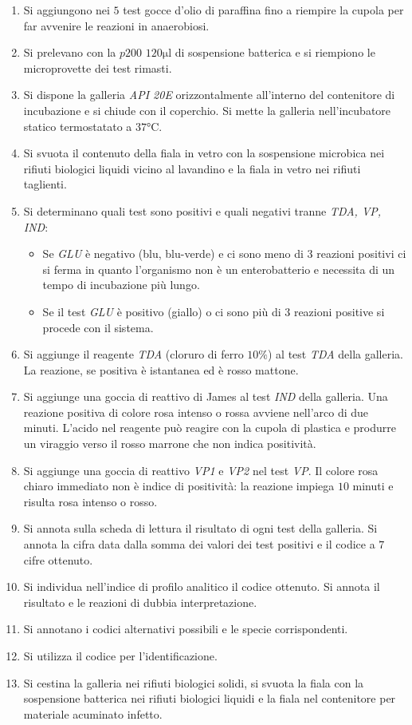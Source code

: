 \begin{enumerate}
			\item Si aggiungono nei $5$ test gocce d'olio di paraffina fino a riempire la cupola per far avvenire le reazioni in anaerobiosi.
			\item Si prelevano con la $p200$ $120\si{\micro\litre}$ di sospensione batterica e si riempiono le microprovette dei test rimasti.
			\item Si dispone la galleria \emph{API 20E} orizzontalmente all'interno del contenitore di incubazione e si chiude con il coperchio.
				Si mette la galleria nell'incubatore statico termostatato a $37\si{\celsius}$.
			\item Si svuota il contenuto della fiala in vetro con la sospensione microbica nei rifiuti biologici liquidi vicino al lavandino e la fiala in vetro nei rifiuti taglienti.
			\item Si determinano quali test sono positivi e quali negativi tranne \emph{TDA, VP, IND}:
				\begin{itemize}
					\item Se \emph{GLU} \`e negativo (blu, blu-verde) e ci sono meno di $3$ reazioni positivi ci si ferma in quanto l'organismo non \`e un enterobatterio e necessita di un tempo di incubazione pi\`u lungo.
					\item Se il test \emph{GLU} \`e positivo (giallo) o ci sono pi\`u di $3$ reazioni positive si procede con il sistema.
				\end{itemize}
			\item Si aggiunge il reagente \emph{TDA} (cloruro di ferro $10\%$) al test \emph{TDA} della galleria.
				La reazione, se positiva \`e istantanea ed \`e rosso mattone.
			\item Si aggiunge una goccia di reattivo di James al test \emph{IND} della galleria.
				Una reazione positiva di colore rosa intenso o rossa avviene nell'arco di due minuti.
				L'acido nel reagente pu\`o reagire con la cupola di plastica e produrre un viraggio verso il rosso marrone che non indica positivit\`a.
			\item Si aggiunge una goccia di reattivo \emph{VP1} e \emph{VP2} nel test \emph{VP}.
				Il colore rosa chiaro immediato non \`e indice di positivit\`a: la reazione impiega $10$ minuti e risulta rosa intenso o rosso.
			\item Si annota sulla scheda di lettura il risultato di ogni test della galleria.
				Si annota la cifra data dalla somma dei valori dei test positivi e il codice a $7$ cifre ottenuto.
			\item Si individua nell'indice di profilo analitico il codice ottenuto.
				Si annota il risultato e le reazioni di dubbia interpretazione.
			\item Si annotano i codici alternativi possibili e le specie corrispondenti.
			\item Si utilizza il codice per l'identificazione.
			\item Si cestina la galleria nei rifiuti biologici solidi, si svuota la fiala con la sospensione batterica nei rifiuti biologici liquidi e la fiala nel contenitore per materiale acuminato infetto.
		\end{enumerate}

